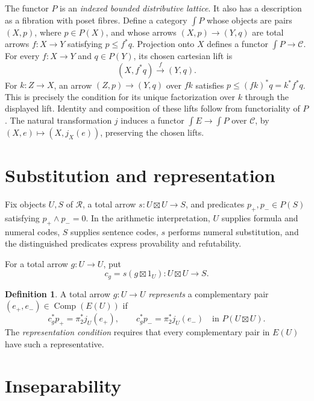\documentclass[11pt]{article}
\theoremstyle{definition}
\newtheorem{definition}[theorem]{Definition}
\newcommand{\R}{\mathcal R}
\newcommand{\C}{\mathcal C}
\newcommand{\Comp}{\operatorname{Comp}}
\begin{document}
The functor $P$ is an \emph{indexed bounded distributive lattice}. It
also has a description as a fibration with poset fibres. Define a category
$\int P$ whose objects are pairs $(X,p)$, where $p\in P(X)$, and whose
arrows $(X,p)\to(Y,q)$ are total arrows $f:X\to Y$ satisfying
$p\leq f^*q$. Projection onto $X$ defines a functor
$\int P\to\C$. For every $f:X\to Y$ and $q\in P(Y)$, its chosen
cartesian lift is
\[
 (X,f^*q)\xrightarrow{\ f\ }(Y,q).
\]
For $k:Z\to X$, an arrow $(Z,p)\to(Y,q)$ over $fk$ satisfies
$p\leq(fk)^*q=k^*f^*q$. This is precisely the condition for its
unique factorization over $k$ through the displayed lift.
Identity and composition of these lifts follow from functoriality of $P$.
The natural transformation $j$ induces a functor $\int E\to\int P$
over $\C$, by $(X,e)\mapsto(X,j_X(e))$, preserving the chosen lifts.

\section{Substitution and representation}

Fix objects $U,S$ of $\R$, a total arrow
$s:U\boxtimes U\to S$, and predicates $p_+,p_-\in P(S)$ satisfying
$p_+\wedge p_-=0$. In the arithmetic interpretation, $U$ supplies formula
and numeral codes, $S$ supplies sentence codes, $s$ performs numeral
substitution, and the distinguished predicates express provability and
refutability.

For a total arrow $g:U\to U$, put
\[
 c_g=s(g\boxtimes1_U):U\boxtimes U\longrightarrow S.
\]
\begin{definition}\label{def:rep}
A total arrow $g:U\to U$ \emph{represents} a complementary pair
$(e_+,e_-)\in\Comp(E(U))$ if
\begin{equation}\label{eq:representation}
 c_g^*p_+=\pi_2^*j_U(e_+),\qquad
 c_g^*p_-=\pi_2^*j_U(e_-)
 \quad\text{in }P(U\boxtimes U).
\end{equation}
The \emph{representation condition} requires that every complementary
pair in $E(U)$ have such a representative.
\end{definition}

\section{Inseparability}
\end{document}
